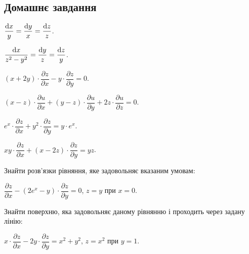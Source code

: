 \subsection*{Домашнє завдання}

\begin{problem}
	$\dfrac{\mathop{}\!\mathrm{d} x}{y} = \dfrac{\mathop{}\!\mathrm{d} y}{x} = \dfrac{\mathop{}\!\mathrm{d} z}{z}$.
\end{problem}

\begin{problem}
	$\dfrac{\mathop{}\!\mathrm{d} x}{z^2 - y^2} = \dfrac{\mathop{}\!\mathrm{d} y}{z} = \dfrac{\mathop{}\!\mathrm{d} z}{y}$. 
\end{problem}

\begin{problem}
	$(x + 2 y) \cdot \dfrac{\partial z}{\partial x} - y \cdot \dfrac{\partial z}{\partial y} = 0$.
\end{problem}

\begin{problem}
	$(x - z) \cdot \dfrac{\partial u}{\partial x} + (y - z) \cdot \dfrac{\partial u}{\partial y} + 2 z \cdot \dfrac{\partial u}{\partial z} = 0$.
\end{problem}

\begin{problem}
	$e^x \cdot \dfrac{\partial z}{\partial x} + y^2 \cdot \dfrac{\partial z}{\partial y} = y \cdot e^x$.
\end{problem}

\begin{problem}
	$x y \cdot \dfrac{\partial z}{\partial x} + (x - 2 z) \cdot \dfrac{\partial z}{\partial y} = y z$.
\end{problem}

Знайти розв'язки рівняння, яке задовольняє вказаним умовам:

\begin{problem}
	$\dfrac{\partial z}{\partial x} - (2 e^x - y) \cdot \dfrac{\partial z}{\partial y} = 0$, $z = y$ при $x = 0$.
\end{problem}

Знайти поверхню, яка задовольняє даному рівнянню і проходить через задану лінію:

\begin{problem}
	$x \cdot \dfrac{\partial z}{\partial x} - 2 y \cdot \dfrac{\partial z}{\partial y} = x^2 + y^2$, $z = x^2$ при $y = 1$.
\end{problem}
